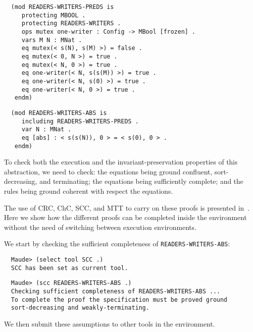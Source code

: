 \begin{small}
\begin{verbatim}
  (mod READERS-WRITERS-PREDS is
     protecting MBOOL .
     protecting READERS-WRITERS .
     ops mutex one-writer : Config -> MBool [frozen] .
     vars M N : MNat .
     eq mutex(< s(N), s(M) >) = false .
     eq mutex(< 0, N >) = true .
     eq mutex(< N, 0 >) = true .
     eq one-writer(< N, s(s(M)) >) = true .
     eq one-writer(< N, s(0) >) = true .
     eq one-writer(< N, 0 >) = true .
   endm)
\end{verbatim}
\end{small}
%
\begin{small}
\begin{verbatim}
  (mod READERS-WRITERS-ABS is
     including READERS-WRITERS-PREDS .
     var N : MNat .
     eq [abs] : < s(s(N)), 0 > = < s(0), 0 > .
   endm)
\end{verbatim}
\end{small}
%
To check both the execution and the invariant-preservation properties
of this abstraction, we need to check:
the equations being ground confluent, sort-decreasing, and terminating;
the equations being sufficiently complete; and
the rules being ground coherent with respect the equations.

The use of CRC, ChC, SCC, and MTT to carry on these proofs is presented in~\cite[Section 12.4]{CDELMMT:2007-book}. Here we show how the different proofs can be 
completed inside the environment without the need of switching between 
execution environments.  

We start by checking the sufficient completeness of \verb~READERS-WRITERS-ABS~: 

\begin{small}
\begin{verbatim}
  Maude> (select tool SCC .)
  SCC has been set as current tool.
\end{verbatim}
\end{small}

\begin{small}
\begin{verbatim}
  Maude> (scc READERS-WRITERS-ABS .)
  Checking sufficient completeness of READERS-WRITERS-ABS ...
  To complete the proof the specification must be proved ground 
  sort-decreasing and weakly-terminating.
\end{verbatim}
\end{small}
%
We then submit these assumptions to other tools in the environment. 

